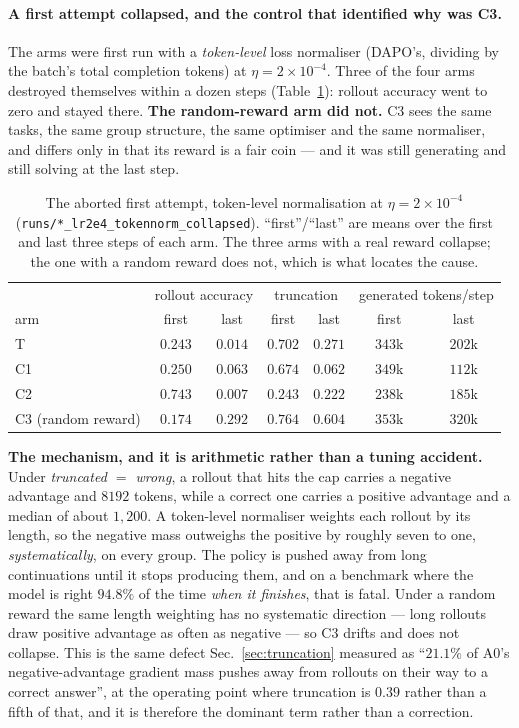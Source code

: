 \paragraph{A first attempt collapsed, and the control that identified why was C3.}
The arms were first run with a \emph{token-level} loss normaliser (DAPO's, dividing by the
batch's total completion tokens) at $\eta=2\times10^{-4}$. Three of the four arms destroyed
themselves within a dozen steps (Table~\ref{tab:b200collapse}): rollout accuracy went to zero
and stayed there. \textbf{The random-reward arm did not.} C3 sees the same tasks, the same
group structure, the same optimiser and the same normaliser, and differs only in that its
reward is a fair coin --- and it was still generating and still solving at the last step.

\begin{table}[t]
\centering\small
\caption{The aborted first attempt, token-level normalisation at $\eta=2\times10^{-4}$
(\texttt{runs/*\_lr2e4\_tokennorm\_collapsed}). ``first''/``last'' are means over the first and
last three steps of each arm. The three arms with a real reward collapse; the one with a
random reward does not, which is what locates the cause.}
\label{tab:b200collapse}
\begin{tabular}{lcccccc}
\toprule
 & \multicolumn{2}{c}{rollout accuracy} & \multicolumn{2}{c}{truncation} &
   \multicolumn{2}{c}{generated tokens/step} \\
arm & first & last & first & last & first & last \\
\midrule
T  & $0.243$ & $\mathbf{0.014}$ & $0.702$ & $0.271$ & $343$k & $202$k \\
C1 & $0.250$ & $\mathbf{0.063}$ & $0.674$ & $0.062$ & $349$k & $112$k \\
C2 & $0.743$ & $\mathbf{0.007}$ & $0.243$ & $0.222$ & $238$k & $185$k \\
C3 (random reward) & $0.174$ & $0.292$ & $0.764$ & $0.604$ & $353$k & $320$k \\
\bottomrule
\end{tabular}
\end{table}

\textbf{The mechanism, and it is arithmetic rather than a tuning accident.} Under
\emph{truncated $=$ wrong}, a rollout that hits the cap carries a negative advantage and
$8192$ tokens, while a correct one carries a positive advantage and a median of about $1{,}200$.
A token-level normaliser weights each rollout by its length, so the negative mass outweighs
the positive by roughly seven to one, \emph{systematically}, on every group. The policy is
pushed away from long continuations until it stops producing them, and on a benchmark where
the model is right $94.8\%$ of the time \emph{when it finishes}, that is fatal. Under a random
reward the same length weighting has no systematic direction --- long rollouts draw positive
advantage as often as negative --- so C3 drifts and does not collapse. This is the same defect
Sec.~\ref{sec:truncation} measured as ``$21.1\%$ of A0's negative-advantage gradient mass
pushes away from rollouts on their way to a correct answer'', at the operating point where
truncation is $0.39$ rather than a fifth of that, and it is therefore the dominant term rather
than a correction.

